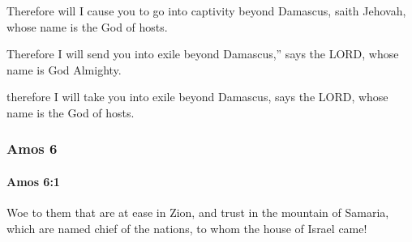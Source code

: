 			\begin{versebox}
					\item[BHS] 
					\item[LXX] 
					\item[ASV] Therefore will I cause you to go into captivity beyond Damascus, saith Jehovah, whose name is the God of hosts.
					\item[NIV] Therefore I will send you into exile beyond Damascus,” says the LORD, whose name is God Almighty.
					\item[NRSV] therefore I will take you into exile beyond Damascus, says the LORD, whose name is the God of hosts.
			\end{versebox}
	\subsubsection{Amos 6} %
		\label{AMOS-6}

		\paragraph{Amos 6:1} %
			\label{AMOS-6-1}

			Woe to them that are at ease in Zion, and trust in the mountain of Samaria, which are named chief of the nations, to whom the house of Israel came!

